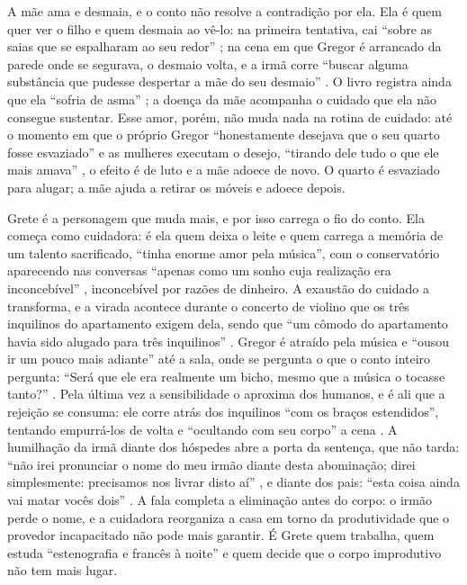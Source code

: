 \documentclass[12pt]{article}
\begin{document}
A mãe ama e desmaia, e o conto não resolve a contradição por ela. Ela é quem quer ver o filho e quem desmaia ao vê-lo: na primeira tentativa, cai ``sobre as saias que se espalharam ao seu redor'' \cite[p. 27]{kafka2022}; na cena em que Gregor é arrancado da parede onde se segurava, o desmaio volta, e a irmã corre ``buscar alguma substância que pudesse despertar a mãe do seu desmaio'' \cite[p. 62]{kafka2022}. O livro registra ainda que ela ``sofria de asma'' \cite[p. 50]{kafka2022}; a doença da mãe acompanha o cuidado que ela não consegue sustentar. Esse amor, porém, não muda nada na rotina de cuidado: até o momento em que o próprio Gregor ``honestamente desejava que o seu quarto fosse esvaziado'' \cite[p. 57]{kafka2022} e as mulheres executam o desejo, ``tirando dele tudo o que ele mais amava'' \cite[p. 60]{kafka2022}, o efeito é de luto e a mãe adoece de novo. O quarto é esvaziado para alugar; a mãe ajuda a retirar os móveis e adoece depois.

Grete é a personagem que muda mais, e por isso carrega o fio do conto. Ela começa como cuidadora: é ela quem deixa o leite \cite[p. 38]{kafka2022} e quem carrega a memória de um talento sacrificado, ``tinha enorme amor pela música'', com o conservatório aparecendo nas conversas ``apenas como um sonho cuja realização era inconcebível'' \cite[p. 48]{kafka2022}, inconcebível por razões de dinheiro. A exaustão do cuidado a transforma, e a virada acontece durante o concerto de violino que os três inquilinos do apartamento exigem dela, sendo que ``um cômodo do apartamento havia sido alugado para três inquilinos'' \cite[p. 78]{kafka2022}. Gregor é atraído pela música e ``ousou ir um pouco mais adiante'' \cite[p. 82]{kafka2022} até a sala, onde se pergunta o que o conto inteiro pergunta: ``Será que ele era realmente um bicho, mesmo que a música o tocasse tanto?'' \cite[p. 83]{kafka2022}. Pela última vez a sensibilidade o aproxima dos humanos, e é ali que a rejeição se consuma: ele corre atrás dos inquilinos ``com os braços estendidos'', tentando empurrá-los de volta e ``ocultando com seu corpo'' a cena \cite[p. 84]{kafka2022}. A humilhação da irmã diante dos hóspedes abre a porta da sentença, que não tarda: ``não irei pronunciar o nome do meu irmão diante desta abominação; direi simplesmente: precisamos nos livrar disto aí'' \cite[p. 87]{kafka2022}, e diante dos pais: ``esta coisa ainda vai matar vocês dois'' \cite[p. 88]{kafka2022}. A fala completa a eliminação antes do corpo: o irmão perde o nome, e a cuidadora reorganiza a casa em torno da produtividade que o provedor incapacitado não pode mais garantir. É Grete quem trabalha, quem estuda ``estenografia e francês à noite'' \cite[p. 70]{kafka2022} e quem decide que o corpo improdutivo não tem mais lugar.
\end{document}
